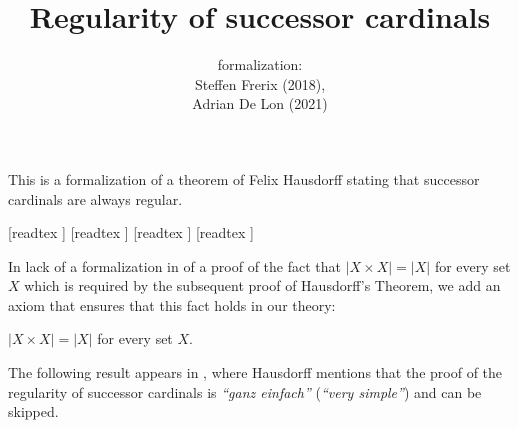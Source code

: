 \documentclass{article}
\title{Regularity of successor cardinals}
\author{\Naproche formalization: \vspace{0.5em} \\
Steffen Frerix (2018), \\
Adrian De Lon (2021)}
\date{}
\begin{document}
  \maketitle

  \noindent This is a formalization of a theorem of Felix Hausdorff stating that
  successor cardinals are always regular.

  \begin{imports}
    \begin{forthel}
      [readtex ]
      [readtex ]
      [readtex ]
      [readtex ]
    \end{forthel}
  \end{imports}

  In lack of a formalization in \Naproche of a proof of the fact that
  $|X \times X| = |X|$ for every set $X$ which is required by the subsequent
  proof of Hausdorff's Theorem, we add an axiom that ensures that this fact
  holds in our theory:

  \begin{forthel}
    \begin{axiom*}
      $|X \times X| = |X|$ for every set $X$.
    \end{axiom*}
  \end{forthel}

  The following result appears in \cite[p.~443]{Hausdorff1908},
  where Hausdorff mentions that the proof of the regularity of successor
  cardinals is \textit{``ganz einfach''} (\textit{``very simple''})
  and can be skipped.
\end{document}
